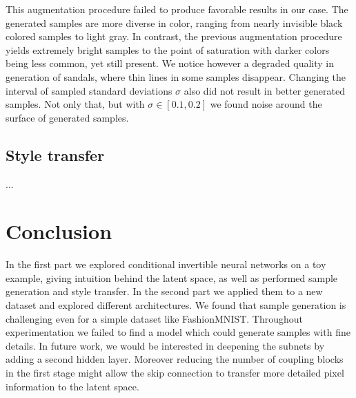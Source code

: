 \documentclass[final]{cvpr}
\begin{document}
This augmentation procedure failed to produce favorable results in our case. The generated samples are more diverse in color, ranging from nearly invisible black colored samples to light gray. In contrast, the previous augmentation procedure yields extremely bright samples to the point of saturation with darker colors being less common, yet still present. We notice however a degraded quality in generation of sandals, where thin lines in some samples disappear. Changing the interval of sampled standard deviations $\sigma$ also did not result in better generated samples. Not only that, but with $\sigma \in [0.1, 0.2]$ we found noise around the surface of generated samples.

\subsection{Style transfer}
...

\section{Conclusion}
In the first part we explored conditional invertible neural networks on a toy example, giving intuition behind the latent space, as well as performed sample generation and style transfer. In the second part we applied them to a new dataset and explored different architectures. We found that sample generation is challenging even for a simple dataset like FashionMNIST. Throughout experimentation we failed to find a model which could generate samples with fine details. In future work, we would be interested in deepening the subnets by adding a second hidden layer. Moreover reducing the number of coupling blocks in the first stage might allow the skip connection to transfer more detailed pixel information to the latent space.

{\small


}
\end{document}
